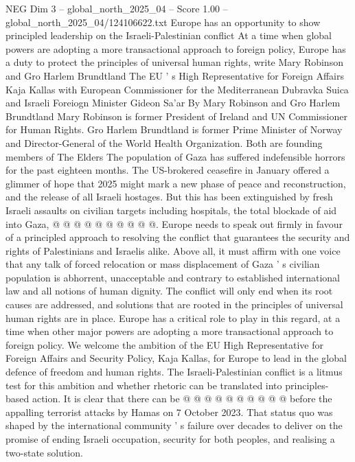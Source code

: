 \begin{textsample}{NEG Dim 3 – global\_north\_2025\_04 – Score 1.00 – global\_north\_2025\_04/124106622.txt}  \label{ex:f3_neg_411}
Europe has an opportunity to show principled leadership on the Israeli-Palestinian conflict At a time when global powers are adopting a more transactional approach to foreign policy, Europe has a duty to protect the principles of universal human rights, write Mary Robinson and Gro Harlem Brundtland The EU ' s High Representative for Foreign Affairs Kaja Kallas with European Commissioner for the Mediterranean Dubravka Suica and Israeli Foreiogn Minister Gideon Sa'ar By Mary Robinson and Gro Harlem Brundtland Mary Robinson is former President of Ireland and UN Commissioner for Human Rights.
Gro Harlem Brundtland is former Prime Minister of Norway and Director-General of the World Health Organization.
Both are founding members of The Elders The population of Gaza has suffered indefensible horrors for the past eighteen months.
The US-brokered ceasefire in January offered a glimmer of hope that 2025 might mark a new phase of peace and reconstruction, and the release of all Israeli hostages.
But this has been extinguished by fresh Israeli assaults on civilian targets including hospitals, the total blockade of aid into Gaza, @ @ @ @ @ @ @ @ @ @.
Europe needs to speak out firmly in favour of a principled approach to resolving the conflict that guarantees the security and rights of Palestinians and Israelis alike.
Above all, it must affirm with one voice that any talk of forced relocation or mass displacement of Gaza ' s civilian population is abhorrent, unacceptable and contrary to established international law and all notions of human dignity.
The conflict will only end when its root causes are addressed, and solutions that are rooted in the principles of universal human rights are in place.
Europe has a critical role to play in this regard, at a time when other major powers are adopting a more transactional approach to foreign policy.
We welcome the ambition of the EU High Representative for Foreign Affairs and Security Policy, Kaja Kallas, for Europe to lead in the global defence of freedom and human rights.
The Israeli-Palestinian conflict is a litmus test for this ambition and whether rhetoric can be translated into principles-based action.
It is clear that there can be @ @ @ @ @ @ @ @ @ @ before the appalling terrorist attacks by Hamas on 7 October 2023.
That status quo was shaped by the international community ' s failure over decades to deliver on the promise of ending Israeli occupation, security for both peoples, and realising a two-state solution.

\end{textsample}
